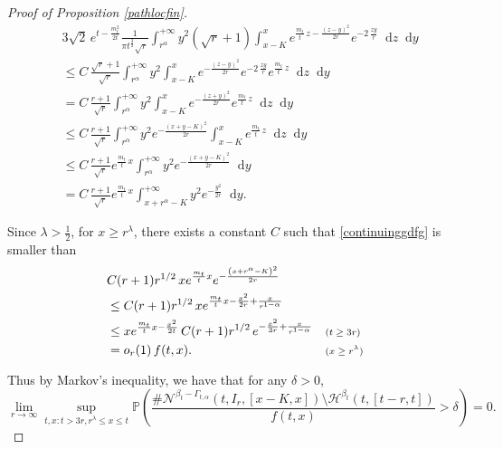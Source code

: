 \documentclass{article}
\newcommand{\nB}[2]{\mathcal{N}^{#1}(#2)}
\newcommand{\Prob}{\mathbb{P}}
\begin{document}
\begin{proof}[Proof of Proposition \ref{pathlocfin}]
\begin{equation}\label{continuinggdfg}
    \begin{split}
        &  3\sqrt{2} \, e^{t - \frac{m_t^2}{2t}} \frac{1}{\pi t^{\frac{3}{2}} \sqrt{r}} \int_{r^\alpha}^{+\infty} y^2 \left( \sqrt{r} + 1 \right) \int_{x-K}^x e^{\frac{m_t}{t} \, z - \frac{(z - y)^2}{2r}} e^{-2 \,\frac{zy}{r}} \mathop{}\!\mathrm{d}z \mathop{}\!\mathrm{d}y
         \\&\leq C \, \frac{\sqrt{r} + 1}{\sqrt{r}} \int_{r^\alpha}^{+\infty} y^2 \int_{x-K}^x e^{-\frac{(z - y)^2}{2r}} e^{-2 \,\frac{zy}{r}} e^{\frac{m_t}{t} \, z} \mathop{}\!\mathrm{d}z \mathop{}\!\mathrm{d}y
         \\&= C \, \frac{r + 1}{\sqrt{r}} \int_{r^\alpha}^{+\infty} y^2 \int_{x-K}^x e^{-\frac{(z + y)^2}{2r}} e^{\frac{m_t}{t} \, z} \mathop{}\!\mathrm{d}z \mathop{}\!\mathrm{d}y
         \\&\leq C \, \frac{r + 1}{\sqrt{r}} \int_{r^\alpha}^{+\infty} y^2 e^{-\frac{(x + y - K)^2}{2r}} \int_{x-K}^x e^{\frac{m_t}{t} \, z} \mathop{}\!\mathrm{d}z \mathop{}\!\mathrm{d}y
         \\&\leq C \, \frac{r + 1}{\sqrt{r}} e^{\frac{m_t}{t} \, x} \int_{r^\alpha}^{+\infty} y^2 e^{-\frac{(x + y - K)^2}{2r}} \mathop{}\!\mathrm{d}y
         \\&= C \, \frac{r + 1}{\sqrt{r}} e^{\frac{m_t}{t} \, x} \int_{x + r^\alpha - K}^{+\infty} y^2 e^{-\frac{y^2}{2r}} \mathop{}\!\mathrm{d}y.
    \end{split}
\end{equation}

Since $\lambda>\frac{1}{2}$, for $x\geq r^\lambda$, there exists a constant $C$ such that \eqref{continuinggdfg} is smaller than
\begin{equation}
    \begin{aligned}
        & C(r + 1) r^{1/2} \, xe^{\frac{m_t}{t} x} e^{-\frac{\left(x + r^\alpha - K\right)^2}{2r}}  
        && \\
        & \leq C(r + 1) r^{1/2} \, xe^{\frac{m_t}{t} x - \frac{x^2}{2r} + \frac{x}{r^{1 - \alpha}}} 
        && \\
        & \leq xe^{\frac{m_t}{t} x - \frac{x^2}{2t}} \, C(r + 1) r^{1/2} \, e^{ -\frac{x^2}{3r} + \frac{x}{r^{1 - \alpha}}} 
        && \text{\scriptsize ($t \geq 3r$)} \\
        & = o_r(1) \, f(t, x). 
        && \text{\scriptsize ($x \geq r^\lambda$)}
    \end{aligned}
\end{equation}

Thus by Markov's inequality, we have that for any $\delta>0$,
\begin{equation}
    \lim_{r\to \infty}\sup_{t,x: t>3r,  r^{\lambda}\leq x\leq t}\Prob\left( \frac{\#  \nB{\beta_t-\Gamma_{t,\alpha}}{t,I_r,[x-K,x]} \setminus \mathcal{H}^{\beta_t}(t, [t-r,t]) }{f(t,x)} >\delta\right) =0.
\end{equation}
\end{proof}
\end{document}
